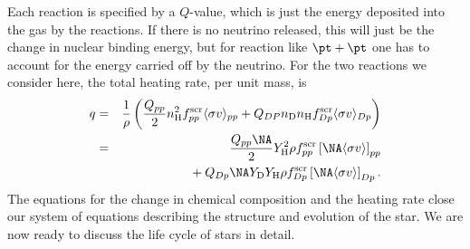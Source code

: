 Each reaction is specified by a $Q$-value, which is just the energy deposited into the gas by the reactions. If there is no neutrino released, this will just be the change in nuclear binding energy, but for reaction like $\pt + \pt$ one has to account for the energy carried off by the neutrino.  For the two reactions we consider here, the total heating rate, per unit mass, is
\begin{eqnarray}
q &=& \frac{1}{\rho}\left(\frac{Q_{pp}}{2}n_{\mathrm{H}}^{2} f^{\mathrm{scr}}_{pp}\langle\sigma v\rangle_{pp} + Q_{DP} n_{\mathrm{D}}n_{\mathrm{H}} f^{\mathrm{scr}}_{Dp}\langle\sigma v\rangle_{Dp}\right)\\
 &=& \frac{Q_{pp}\NA}{2}Y_{\mathrm{H}}^{2}\rho f^{\mathrm{scr}}_{pp} \left[\NA\langle\sigma v\rangle\right]_{pp} \nonumber \\
 && {}+ Q_{Dp}\NA Y_{\mathrm{D}}Y_{\mathrm{H}} \rho f^{\mathrm{scr}}_{Dp} \left[\NA\langle\sigma v\rangle\right]_{Dp} .
\label{e.heating-rate}
\end{eqnarray}
The equations for the change in chemical composition and the heating rate close our system of equations describing the structure and evolution of the star.  We are now ready to discuss the life cycle of stars in detail.
 